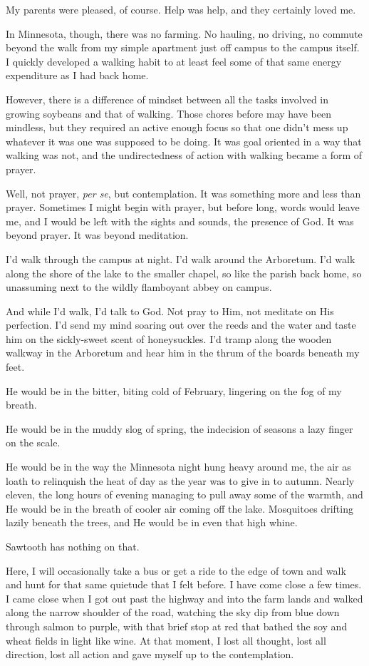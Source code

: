 My parents were pleased, of course. Help was help, and they certainly loved me.

In Minnesota, though, there was no farming. No hauling, no driving, no commute beyond the walk from my simple apartment just off campus to the campus itself. I quickly developed a walking habit to at least feel some of that same energy expenditure as I had back home.

However, there is a difference of mindset between all the tasks involved in growing soybeans and that of walking. Those chores before may have been mindless, but they required an active enough focus so that one didn't mess up whatever it was one was supposed to be doing. It was goal oriented in a way that walking was not, and the undirectedness of action with walking became a form of prayer.

Well, not prayer, \emph{per se}, but contemplation. It was something more and less than prayer. Sometimes I might begin with prayer, but before long, words would leave me, and I would be left with the sights and sounds, the presence of God. It was beyond prayer. It was beyond meditation.

I'd walk through the campus at night. I'd walk around the Arboretum. I'd walk along the shore of the lake to the smaller chapel, so like the parish back home, so unassuming next to the wildly flamboyant abbey on campus.

And while I'd walk, I'd talk to God. Not pray to Him, not meditate on His perfection. I'd send my mind soaring out over the reeds and the water and taste him on the sickly-sweet scent of honeysuckles. I'd tramp along the wooden walkway in the Arboretum and hear him in the thrum of the boards beneath my feet.

He would be in the bitter, biting cold of February, lingering on the fog of my breath.

He would be in the muddy slog of spring, the indecision of seasons a lazy finger on the scale.

He would be in the way the Minnesota night hung heavy around me, the air as loath to relinquish the heat of day as the year was to give in to autumn. Nearly eleven, the long hours of evening managing to pull away some of the warmth, and He would be in the breath of cooler air coming off the lake. Mosquitoes drifting lazily beneath the trees, and He would be in even that high whine.

Sawtooth has nothing on that.

Here, I will occasionally take a bus or get a ride to the edge of town and walk and hunt for that same quietude that I felt before. I have come close a few times. I came close when I got out past the highway and into the farm lands and walked along the narrow shoulder of the road, watching the sky dip from blue down through salmon to purple, with that brief stop at red that bathed the soy and wheat fields in light like wine. At that moment, I lost all thought, lost all direction, lost all action and gave myself up to the contemplation.

